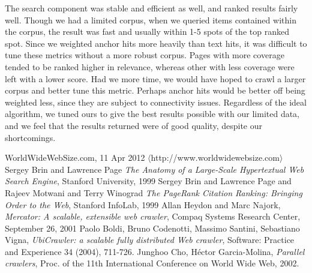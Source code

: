 \documentclass[11pt, letterpaper, oneside, twocolumn]{article}
\begin{document}
The search component was stable and efficient as well, and ranked results fairly well. 
Though we had a limited corpus, when we queried items contained within the corpus, the result was fast and usually within 1-5 spots of the top ranked spot. 
Since we weighted anchor hits more heavily than text hits, it was difficult to tune these metrics without a more robust corpus. 
Pages with more coverage tended to be ranked higher in relevance, whereas other with less coverage were left with a lower score. 
Had we more time, we would have hoped to crawl a larger corpus and better tune this metric. 
Perhaps anchor hits would be better off being weighted less, since they are subject to connectivity issues. 
Regardless of the ideal algorithm, we tuned ours to give the best results possible with our limited data, and we feel that the results returned were of good quality, despite our shortcomings.


\begin{thebibliography}{9}

   WorldWideWebSize.com, 11 Apr 2012 $\langle$http://www.worldwidewebsize.com$\rangle$
   Sergey Brin and Lawrence Page \emph{The Anatomy of a Large-Scale Hypertextual Web Search Engine}, Stanford University, 1999
   Sergey Brin and  Lawrence Page and Rajeev Motwani and Terry Winograd \emph{The PageRank Citation Ranking: Bringing Order to the Web}, Stanford InfoLab, 1999
   Allan Heydon and Marc Najork, \emph{Mercator: A scalable, extensible web crawler}, Compaq Systems Research Center, September 26, 2001
   Paolo Boldi, Bruno Codenotti, Massimo Santini, Sebastiano Vigna, \emph{UbiCrawler: a scalable fully distributed Web crawler}, Software: Practice and Experience 34 (2004), 711-726.
   Junghoo Cho, H\'{e}ctor Garcia-Molina, \emph{Parallel crawlers}, Proc. of the 11th International Conference on World Wide Web, 2002.


\end{thebibliography}
\end{document}
